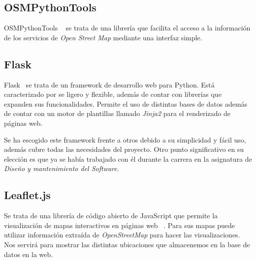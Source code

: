 \subsection{OSMPythonTools}
OSMPythonTools ~\cite{OSMP} se trata de una librería que facilita el acceso a la información de los servicios de \textit{Open Street Map}
mediante una interfaz simple. 

\subsection{Flask}
Flask~\cite{Flask} se trata de un framework de desarrollo web para Python. Está caracterizado por se ligero y flexible,
además de contar con librerías que expanden sus funcionalidades. Permite el uso de distintas bases de datos además de contar
con un motor de plantillas llamado \textit{Jinja2} para el renderizado de páginas web.

Se ha escogido este framework frente a otros debido a su simplicidad y fácil uso, además cubre todas
las necesidades del proyecto. Otro punto significativo en su elección es que ya se había trabajado con él
durante la carrera en la asignatura de \textit{Diseño y mantenimiento del Software}.


\subsection{Leaflet.js}
Se trata de una librería de código abierto de JavaScript que permite la visualización de mapas interactivos en páginas web ~\cite{leaflet}.
Para sus mapas puede utilizar información extraída de \textit{OpenStreetMap} para hacer las visualizaciones.
Nos servirá para mostrar las distintas ubicaciones que almacenemos en la base de datos en la web.

